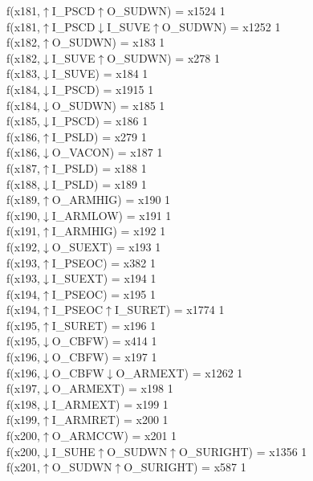 f(x181,$\uparrow$I\_PSCD$\uparrow$O\_SUDWN) = x1524 {1} \\
f(x181,$\uparrow$I\_PSCD$\downarrow$I\_SUVE$\uparrow$O\_SUDWN) = x1252 {1} \\
f(x182,$\uparrow$O\_SUDWN) = x183 {1} \\
f(x182,$\downarrow$I\_SUVE$\uparrow$O\_SUDWN) = x278 {1} \\
f(x183,$\downarrow$I\_SUVE) = x184 {1} \\
f(x184,$\downarrow$I\_PSCD) = x1915 {1} \\
f(x184,$\downarrow$O\_SUDWN) = x185 {1} \\
f(x185,$\downarrow$I\_PSCD) = x186 {1} \\
f(x186,$\uparrow$I\_PSLD) = x279 {1} \\
f(x186,$\downarrow$O\_VACON) = x187 {1} \\
f(x187,$\uparrow$I\_PSLD) = x188 {1} \\
f(x188,$\downarrow$I\_PSLD) = x189 {1} \\
f(x189,$\uparrow$O\_ARMHIG) = x190 {1} \\
f(x190,$\downarrow$I\_ARMLOW) = x191 {1} \\
f(x191,$\uparrow$I\_ARMHIG) = x192 {1} \\
f(x192,$\downarrow$O\_SUEXT) = x193 {1} \\
f(x193,$\uparrow$I\_PSEOC) = x382 {1} \\
f(x193,$\downarrow$I\_SUEXT) = x194 {1} \\
f(x194,$\uparrow$I\_PSEOC) = x195 {1} \\
f(x194,$\uparrow$I\_PSEOC$\uparrow$I\_SURET) = x1774 {1} \\
f(x195,$\uparrow$I\_SURET) = x196 {1} \\
f(x195,$\downarrow$O\_CBFW) = x414 {1} \\
f(x196,$\downarrow$O\_CBFW) = x197 {1} \\
f(x196,$\downarrow$O\_CBFW$\downarrow$O\_ARMEXT) = x1262 {1} \\
f(x197,$\downarrow$O\_ARMEXT) = x198 {1} \\
f(x198,$\downarrow$I\_ARMEXT) = x199 {1} \\
f(x199,$\uparrow$I\_ARMRET) = x200 {1} \\
f(x200,$\uparrow$O\_ARMCCW) = x201 {1} \\
f(x200,$\downarrow$I\_SUHE$\uparrow$O\_SUDWN$\uparrow$O\_SURIGHT) = x1356 {1} \\
f(x201,$\uparrow$O\_SUDWN$\uparrow$O\_SURIGHT) = x587 {1} \\
